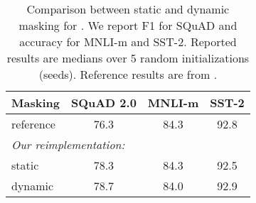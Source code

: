 \begin{table}[t]
\begin{center}
\begin{tabular}{lccc}
\toprule
\bf Masking & \bf SQuAD 2.0 & \bf MNLI-m & \bf SST-2 \\
\midrule
reference & 76.3 & 84.3 & 92.8 \\
\midrule
\multicolumn{4}{l}{\emph{Our reimplementation:}} \\
static & 78.3 & 84.3 & 92.5 \\
dynamic & 78.7 & 84.0 & 92.9 \\
\bottomrule
\end{tabular}
\end{center}
\caption{Comparison between static and dynamic masking for \bertbase{}.
We report F1 for SQuAD and accuracy for MNLI-m and SST-2.
Reported results are medians over 5 random initializations (seeds).
Reference results are from .}
\label{tab:static_vs_dynamic_masking}
\end{table}
